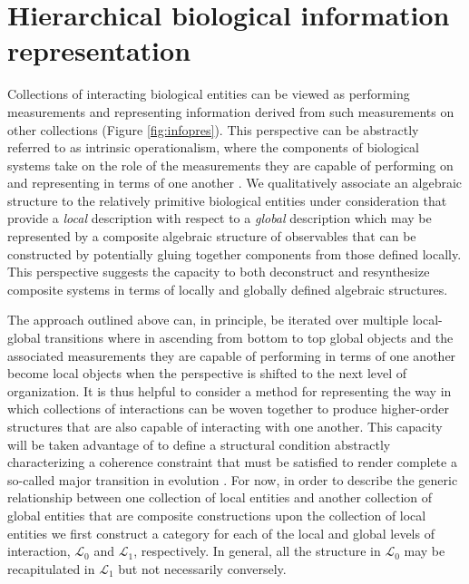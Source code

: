 \documentclass[aps,twocolumn]{revtex4-1}
\begin{document}
\section{Hierarchical biological information representation}
Collections of interacting biological entities can be viewed as performing measurements and representing information derived from such measurements on other collections (Figure \ref{fig:infopres}). This perspective can be abstractly referred to as intrinsic operationalism, where the components of biological systems take on the role of the measurements they are capable of performing on and representing in terms of one another \cite{Wolkenhauer2007,Houle2011}. We qualitatively associate an algebraic structure to the relatively primitive biological entities under consideration that provide a {\it local} description with respect to a {\it global} description which may be represented by a composite algebraic structure of observables that can be constructed by potentially gluing together components from those defined locally. This perspective suggests the capacity to both deconstruct and resynthesize composite systems in terms of locally and globally defined algebraic structures.

The approach outlined above can, in principle, be iterated over multiple local-global transitions where in ascending from bottom to top global objects and the associated measurements they are capable of performing in terms of one another become local objects when the perspective is shifted to the next level of organization. It is thus helpful to consider a method for representing the way in which collections of interactions can be woven together to produce higher-order structures that are also capable of interacting with one another. This capacity will be taken advantage of to define a structural condition abstractly characterizing a coherence constraint that must be satisfied to render complete a so-called major transition in evolution \cite{MaynardSmith1995,Okasha2006,Calcott2011}. For now, in order to describe the generic relationship between one collection of local entities and another collection of global entities that are composite constructions upon the collection of local entities we first construct a category for each of the local and global levels of interaction, $\mathcal{L}_0$ and $\mathcal{L}_1$, respectively. In general, all the structure in $\mathcal{L}_0$ may be recapitulated in $\mathcal{L}_1$ but not necessarily conversely.
\end{document}
